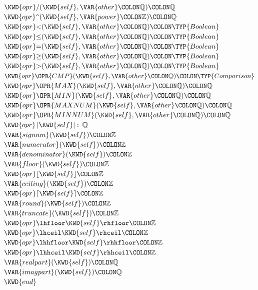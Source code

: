 \begin{Fortress}
\(  \KWD{opr} /(\KWD{self}, \VAR{other}\COLON \mathbb{Q})\COLON \mathbb{Q}\)\\
\(  \KWD{opr} \mathord{\hbox{\tt\char'136}}(\KWD{self}, \VAR{power}\COLON \mathbb{Z})\COLON \mathbb{Q}\)\\
\(  \KWD{opr} \mathord{<}(\KWD{self}, \VAR{other}\COLON \mathbb{Q})\COLON \TYP{Boolean}\)\\
\(  \KWD{opr} \mathord{\leq}(\KWD{self}, \VAR{other}\COLON \mathbb{Q})\COLON \TYP{Boolean}\)\\
\(  \KWD{opr} \mathord{=}(\KWD{self}, \VAR{other}\COLON \mathbb{Q})\COLON \TYP{Boolean}\)\\
\(  \KWD{opr} \mathord{\geq}(\KWD{self}, \VAR{other}\COLON \mathbb{Q})\COLON \TYP{Boolean}\)\\
\(  \KWD{opr} \mathord{>}(\KWD{self}, \VAR{other}\COLON \mathbb{Q})\COLON \TYP{Boolean}\)\\
\(  \KWD{opr} \mathord{\OPR{CMP}}(\KWD{self}, \VAR{other}\COLON \mathbb{Q})\COLON \TYP{Comparison}\)\\
\(  \KWD{opr} \mathord{\OPR{MAX}}(\KWD{self}, \VAR{other}\COLON \mathbb{Q})\COLON \mathbb{Q}\)\\
\(  \KWD{opr} \mathord{\OPR{MIN}}(\KWD{self}, \VAR{other}\COLON \mathbb{Q})\COLON \mathbb{Q}\)\\
\(  \KWD{opr} \mathord{\OPR{MAXNUM}}(\KWD{self}, \VAR{other}\COLON \mathbb{Q})\COLON \mathbb{Q}\)\\
\(  \KWD{opr} \mathord{\OPR{MINNUM}}(\KWD{self}, \VAR{other}\COLON \mathbb{Q})\COLON \mathbb{Q}\)\\
\(  \KWD{opr} \left|\mathord{\KWD{self}}\right| \mathrel{\mathtt{:}}\:\mathbb{Q}\)\\
\(  \VAR{signum}(\KWD{self})\COLON \mathbb{Z}\)\\
\(  \VAR{numerator}(\KWD{self})\COLON \mathbb{Z}\)\\
\(  \VAR{denominator}(\KWD{self})\COLON \mathbb{Z}\)\\
\(  \VAR{floor}(\KWD{self})\COLON \mathbb{Z}\)\\
\(  \KWD{opr} \lfloor \mathord{\KWD{self}} \rfloor\COLON \mathbb{Z}\)\\
\(  \VAR{ceiling}(\KWD{self})\COLON \mathbb{Z}\)\\
\(  \KWD{opr} \lceil \mathord{\KWD{self}} \rceil\COLON \mathbb{Z}\)\\
\(  \VAR{round}(\KWD{self})\COLON \mathbb{Z}\)\\
\(  \VAR{truncate}(\KWD{self})\COLON \mathbb{Z}\)\\
\(  \KWD{opr} \lhfloor \mathord{\KWD{self}} \rhfloor\COLON \mathbb{Z}\)\\
\(  \KWD{opr} \lhceil \mathord{\KWD{self}} \rhceil\COLON \mathbb{Z}\)\\
\(  \KWD{opr} \lhhfloor \mathord{\KWD{self}} \rhhfloor\COLON \mathbb{Z}\)\\
\(  \KWD{opr} \lhhceil \mathord{\KWD{self}} \rhhceil\COLON \mathbb{Z}\)\\
\(  \VAR{realpart}(\KWD{self})\COLON \mathbb{Q}\)\\
\(  \VAR{imagpart}(\KWD{self})\COLON \mathbb{Q}\)\-\\\poptabs
\(\KWD{end}\)
\end{Fortress}
